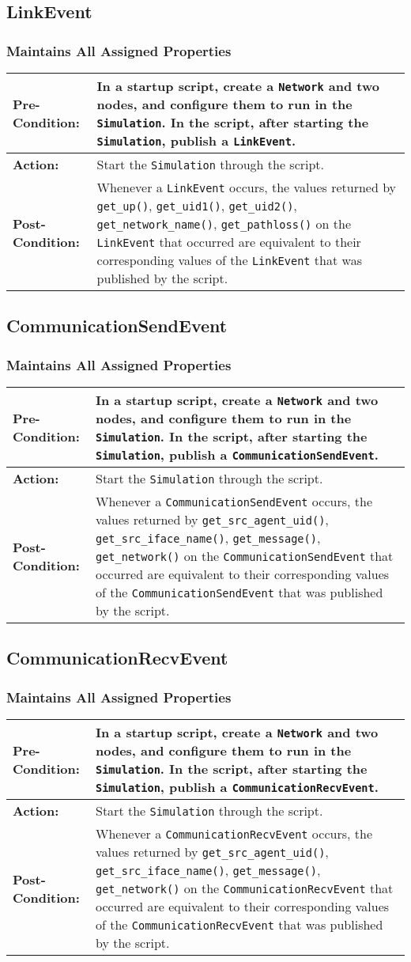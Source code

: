 \documentclass[titlepage]{article}
\newcommand{\testcase}[3]{
    \begin{center}
    \begin{tabular}{| l | p{0.7\textwidth}|}
        \hline
        \rowcolor[gray]{0.8}\textbf{Pre-Condition:} & #1 \\ \hline
        \textbf{Action:} & #2 \\ \hline
        \rowcolor[gray]{0.8}\textbf{Post-Condition:} & #3 \\ \hline
    \end{tabular}
    \end{center}
}
\begin{document}
\subsection{LinkEvent}
\subsubsection{Maintains All Assigned Properties}
\testcase{In a startup script, create a \texttt{Network} and two nodes, and configure them to run in the \texttt{Simulation}. In the script, after starting the \texttt{Simulation}, publish a \texttt{LinkEvent}.}{Start the \texttt{Simulation} through the script.}{Whenever a \texttt{LinkEvent} occurs, the values returned by  \texttt{get\_up()}, \texttt{get\_uid1()}, \texttt{get\_uid2()}, \texttt{get\_network\_name()}, \texttt{get\_pathloss()} on the \texttt{LinkEvent} that occurred are equivalent to their corresponding values of the \texttt{LinkEvent} that was published by the script.}

\subsection{CommunicationSendEvent}
\subsubsection{Maintains All Assigned Properties}
\testcase{In a startup script, create a \texttt{Network} and two nodes, and configure them to run in the \texttt{Simulation}.  In the script, after starting the \texttt{Simulation}, publish a \texttt{CommunicationSendEvent}.}{Start the \texttt{Simulation} through the script.}{Whenever a \texttt{CommunicationSendEvent} occurs, the values returned by \texttt{get\_src\_agent\_uid()}, \texttt{get\_src\_iface\_name()}, \texttt{get\_message()}, \texttt{get\_network()} on the \texttt{CommunicationSendEvent} that occurred are equivalent to their corresponding values of the \texttt{CommunicationSendEvent} that was published by the script.}

\subsection{CommunicationRecvEvent}
\subsubsection{Maintains All Assigned Properties}
\testcase{In a startup script, create a \texttt{Network} and two nodes, and configure them to run in the \texttt{Simulation}. In the script, after starting the \texttt{Simulation}, publish a \texttt{CommunicationRecvEvent}.}{Start the \texttt{Simulation} through the script.}{Whenever a \texttt{CommunicationRecvEvent} occurs, the values returned by \texttt{get\_src\_agent\_uid()}, \texttt{get\_src\_iface\_name()}, \texttt{get\_message()}, \texttt{get\_network()} on the \texttt{CommunicationRecvEvent} that occurred are equivalent to their corresponding values of the \texttt{CommunicationRecvEvent} that was published by the script.}
\end{document}
